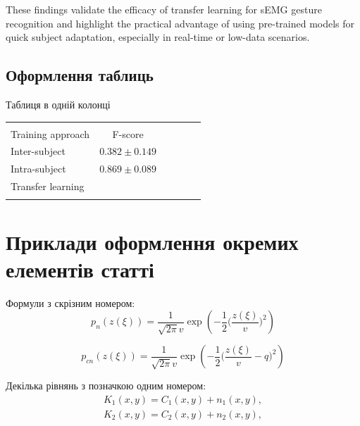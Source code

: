 \begin{multicols}{2}
These findings validate the efficacy of transfer learning for sEMG gesture recognition and highlight the practical advantage of using pre-trained models for quick subject adaptation, especially in real-time or low-data scenarios.

\subsection{Оформлення таблиць}

Таблиця в одній колонці
\begin{Table}
	\begin{tabularx}{\linewidth}{|l|c|c|c|c|X|}
		\hline   &   &  &  &  &  \\
		\rule{0pt}{10pt} Training approach  & F-score  &	 &	  & &	 \\ 
		\hline 
		\rule{0pt}{10pt} Inter-subject & $0.382 \pm 0.149$ &	 &	  &	  &	 \\ 
		\hline 
		\rule{0pt}{10pt} Intra-subject & $0.869 \pm 0.089$ &   &	  &	  &  \\ 
		\hline 
		\rule{0pt}{10pt} Transfer learning &   &   &	  &	  & \\ 
		\hline 
		\rule{0pt}{10pt}   &	  &  &   &	  &  \\ 
		\hline 
\end{tabularx} \label{radap1725tab1}
\end{Table}

\section{Приклади оформлення окремих елементів статті}

Формули з скрізним номером: 
\begin{equation}\label{radap1725eq1}
p_n(z(\xi)) = \frac{1}{\sqrt{2\pi} v} \exp  \left(-\frac{1}{2}\Bigg(\frac{z(\xi)}{v} \Bigg)^2 \right)
\end{equation}

\begin{equation}\label{radap1725eq2}
p_{cn}(z(\xi)) = \frac{1}{\sqrt{2\pi} v} \exp  \left(-\frac{1}{2}\Bigg(\frac{z(\xi)}{v}-q \Bigg)^2 \right) 
\end{equation}

Декілька рівнянь з позначкою одним номером:
\begin{equation*}
\begin{aligned}
{K_1}\left( {x,y} \right) = {C_1}\left( {x,y} \right) + {n_1}\left( {x,y} \right),\\	
{K_2}\left( {x,y} \right) = {C_2}\left( {x,y} \right) + {n_2}\left( {x,y} \right),
\end{aligned}
\end{equation*}


\end{multicols}

